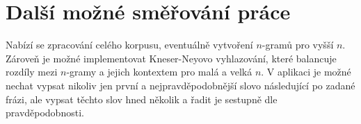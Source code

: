 \section{Další možné směřování práce}

Nabízí se zpracování celého korpusu, eventuálně vytvoření $n$-gramů pro vyšší $n$. Zároveň je možné implementovat Kneser-Neyovo vyhlazování, které balancuje rozdíly mezi $n$-gramy a jejich kontextem pro malá a velká $n$. V aplikaci je možné nechat vypsat nikoliv jen první a nejpravděpodobnější slovo následující po zadané frázi, ale vypsat těchto slov hned několik a řadit je sestupně dle pravděpodobnosti.


\newpage







